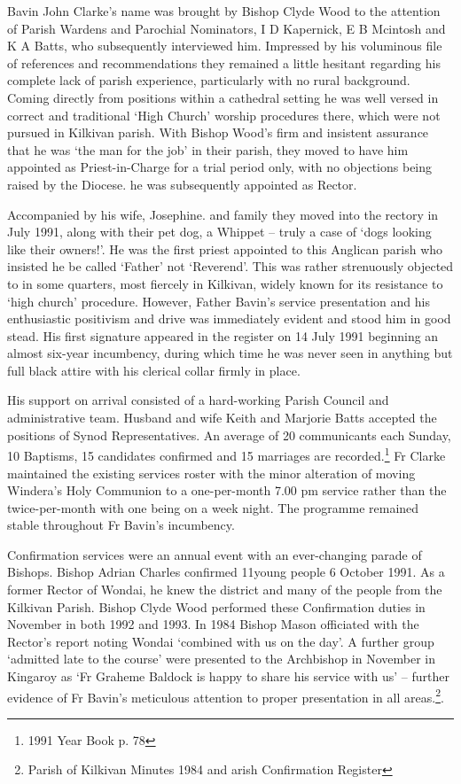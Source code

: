 Bavin John Clarke's name was brought by Bishop Clyde Wood to the attention of Parish Wardens and Parochial Nominators, I D Kapernick, E B Mcintosh and K A Batts, who subsequently interviewed him. Impressed by his voluminous file of references and recommendations they remained a little hesitant regarding his complete lack of parish experience, particularly with no rural background. Coming directly from positions within a cathedral setting he was well versed in correct and traditional `High Church' worship procedures there, which were not pursued in Kilkivan parish. With Bishop Wood's firm and insistent assurance that he was `the man for the job' in their parish, they moved to have him appointed as Priest-in-Charge for a trial period only, with no objections being raised by the Diocese. he was subsequently appointed as Rector.



Accompanied by his wife, Josephine. and family they moved into the rectory in July 1991, along with their pet dog, a Whippet -- truly a case of `dogs looking like their owners!'. He was the first priest appointed to this Anglican parish who insisted he be called `Father' not `Reverend'. This was rather strenuously objected to in some quarters, most fiercely in Kilkivan, widely known for its resistance to `high church' procedure. However, Father Bavin's service presentation and his enthusiastic positivism and drive was immediately evident and stood him in good stead. His first signature appeared in the register on 14 July 1991 beginning an almost six-year incumbency, during which time he was never seen in anything but full black attire with his clerical collar firmly in place.



His support on arrival consisted of a hard-working Parish Council and administrative team. Husband and wife Keith and Marjorie Batts accepted the positions of Synod Representatives. An average of 20 communicants each Sunday, 10 Baptisms, 15 candidates confirmed and 15 marriages are recorded.\footnote{1991 Year Book p. 78} Fr Clarke maintained the existing services roster with the minor alteration of moving Windera's Holy Communion to a one-per-month 7.00 pm service rather than the twice-per-month with one being on a week night. The programme remained stable throughout Fr Bavin's incumbency.


Confirmation services were an annual event with an ever-changing parade of Bishops. Bishop Adrian Charles confirmed 11young people 6 October 1991. As a former Rector of Wondai, he knew the district and many of the people from the Kilkivan Parish. Bishop Clyde Wood performed these Confirmation duties in November in both 1992 and 1993. In 1984 Bishop Mason officiated with the Rector's report noting Wondai `combined with us on the day'. A further group `admitted late to the course' were presented to the Archbishop in November in Kingaroy as `Fr Graheme Baldock is happy to share his service with us' -- further evidence of Fr Bavin's meticulous attention to proper presentation in all areas.\footnote{Parish of Kilkivan Minutes 1984 and arish Confirmation Register}.


